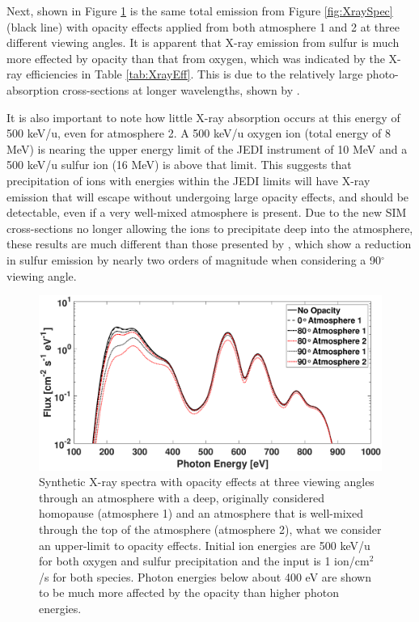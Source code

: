 \documentclass[draft]{agujournal2018}
\begin{document}
Next, shown in Figure \ref{fig:XraySpecOpac} is the same total emission from Figure \ref{fig:XraySpec} (black line) with opacity effects applied from both atmosphere 1 and 2 at three different viewing angles.
It is apparent that X-ray emission from sulfur is much more effected by opacity than that from oxygen, which was indicated by the X-ray efficiencies in Table \ref{tab:XrayEff}.
This is due to the relatively large photo-absorption cross-sections at longer wavelengths, shown by \citet{cravens2006}.

It is also important to note how little X-ray absorption occurs at this energy of 500 keV/u, even for atmosphere 2.
A 500 keV/u oxygen ion (total energy of 8 MeV) is nearing the upper energy limit of the JEDI instrument of 10 MeV \citep{mauk2017ssr} and a 500 keV/u sulfur ion (16 MeV) is above that limit.
This suggests that precipitation of ions with energies within the JEDI limits will have X-ray emission that will escape without undergoing large opacity effects, and should be detectable, even if a very well-mixed atmosphere is present.
Due to the new SIM cross-sections no longer allowing the ions to precipitate deep into the atmosphere, these results are much different than those presented by \citet{ozak2010}, which show a reduction in sulfur emission by nearly two orders of magnitude when considering a 90$^{\circ}$ viewing angle.

\begin{figure}[ht]
    \centering
    \includegraphics[width=\textwidth]{Figures/OpacityATM1ATM2.eps}
    \caption{Synthetic X-ray spectra with opacity effects at three viewing angles through an atmosphere with a deep, originally considered homopause (atmosphere 1) and an atmosphere that is well-mixed through the top of the atmosphere (atmosphere 2), what we consider an upper-limit to opacity effects. Initial ion energies are 500 keV/u for both oxygen and sulfur precipitation and the input is 1 ion/cm$^2$/s for both species. Photon energies below about 400 eV are shown to be much more affected by the opacity than higher photon energies.}
    \label{fig:XraySpecOpac}
\end{figure}
\end{document}
